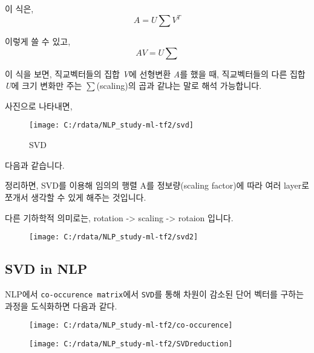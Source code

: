 \documentclass[
]{article}
\begin{document}
이 식은, \[
A = U\sum V^T
\]

이렇게 쓸 수 있고, \[
AV = U\sum
\]

이 식을 보면, 직교벡터들의 집합 \emph{V}에 선형변환 \emph{A}를 했을 때,
직교벡터들의 다른 집합 \emph{U}에 크기 변화만 주는
\emph{\(\sum\)}(scaling)의 곱과 같냐는 말로 해석 가능합니다.

사진으로 나타내면,

\begin{figure}

{\centering \texttt{[image: C:/rdata/NLP\_study-ml-tf2/svd]} 

}

\caption{SVD}\label{fig:unnamed-chunk-18}
\end{figure}

다음과 같습니다.

정리하면, SVD를 이용해 임의의 행렬 A를 정보량(scaling factor)에 따라
여러 layer로 쪼개서 생각할 수 있게 해주는 것입니다.

다른 기하학적 의미로는, rotation -\textgreater{} scaling -\textgreater{}
rotaion 입니다.

\begin{figure}

{\centering \texttt{[image: C:/rdata/NLP\_study-ml-tf2/svd2]} 

}

\end{figure}

\hypertarget{svd-in-nlp}{%
\subsection{SVD in NLP}\label{svd-in-nlp}}

NLP에서 \texttt{co-occurence\ matrix}에서 \texttt{SVD}를 통해 차원이
감소된 단어 벡터를 구하는 과정을 도식화하면 다음과 같다.

\begin{figure}

{\centering \texttt{[image: C:/rdata/NLP\_study-ml-tf2/co-occurence]} 

}

\end{figure}
\begin{figure}

{\centering \texttt{[image: C:/rdata/NLP\_study-ml-tf2/SVDreduction]} 

}

\end{figure}
\end{document}

